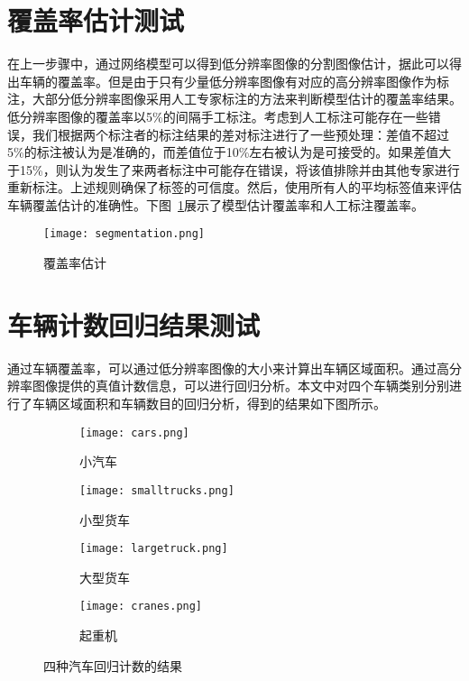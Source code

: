 \section{覆盖率估计测试}
在上一步骤中，通过网络模型可以得到低分辨率图像的分割图像估计，据此可以得出车辆的覆盖率。但是由于只有少量低分辨率图像有对应的高分辨率图像作为标注，大部分低分辨率图像采用人工专家标注的方法来判断模型估计的覆盖率结果。低分辨率图像的覆盖率以5\%的间隔手工标注。考虑到人工标注可能存在一些错误，我们根据两个标注者的标注结果的差对标注进行了一些预处理：差值不超过5\%的标注被认为是准确的，而差值位于10\%左右被认为是可接受的。如果差值大于15\%，则认为发生了来两者标注中可能存在错误，将该值排除并由其他专家进行重新标注。上述规则确保了标签的可信度。然后，使用所有人的平均标签值来评估车辆覆盖估计的准确性。下图~\ref{fig:seg}展示了模型估计覆盖率和人工标注覆盖率。
\begin{figure}[h]
    \centering
    \texttt{[image: segmentation.png]}
    \caption{覆盖率估计}
    \label{fig:seg}
\end{figure}

\section{车辆计数回归结果测试}
通过车辆覆盖率，可以通过低分辨率图像的大小来计算出车辆区域面积。通过高分辨率图像提供的真值计数信息，可以进行回归分析。本文中对四个车辆类别分别进行了车辆区域面积和车辆数目的回归分析，得到的结果如下图所示。
\begin{figure}[h]
    \centering
    \begin{subfigure}{0.45\textwidth}
      \texttt{[image: cars.png]}
      \caption{小汽车}
      \label{fig:subfig-a}
    \end{subfigure}\quad %
    \begin{subfigure}{0.45\textwidth}
      \texttt{[image: smalltrucks.png]}
      \caption{小型货车}
      \label{fig:subfig-b}
    \end{subfigure}
  
    \begin{subfigure}{0.45\textwidth}
      \texttt{[image: largetruck.png]}
      \caption{大型货车}
      \label{fig:subfig-c}
    \end{subfigure}\quad %
    \begin{subfigure}{0.45\textwidth}
      \texttt{[image: cranes.png]}
      \caption{起重机}
      \label{fig:subfig-d}
    \end{subfigure}
  
    \caption{四种汽车回归计数的结果}
    \label{fig:multi-image}
\end{figure}

